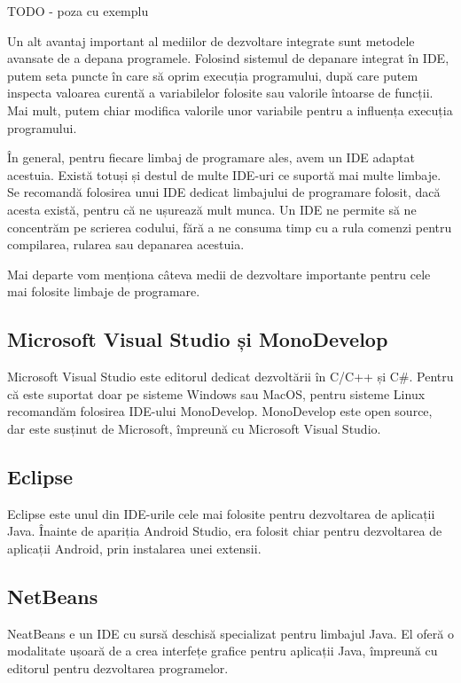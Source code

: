 TODO - poza cu exemplu

Un alt avantaj important al mediilor de dezvoltare integrate sunt metodele
avansate de a depana programele. Folosind sistemul de depanare integrat în IDE,
putem seta puncte în care să oprim execuția programului, după care putem
inspecta valoarea curentă a variabilelor folosite sau valorile întoarse de
funcții. Mai mult, putem chiar modifica valorile unor variabile pentru a
influența execuția programului.

În general, pentru fiecare limbaj de programare ales, avem un IDE adaptat
acestuia. Există totuși și destul de multe IDE-uri ce suportă mai multe limbaje.
Se recomandă folosirea unui IDE dedicat limbajului de programare folosit, dacă
acesta există, pentru că ne ușurează mult munca. Un IDE ne permite să ne
concentrăm pe scrierea codului, fără a ne consuma timp cu a rula comenzi pentru
compilarea, rularea sau depanarea acestuia.

Mai departe vom menționa câteva medii de dezvoltare importante pentru cele mai
folosite limbaje de programare.

\subsection{Microsoft Visual Studio și MonoDevelop}
\label{sec:appdev-ide-vs-mono}

Microsoft Visual Studio este editorul dedicat dezvoltării în C/C++ și C\#.
Pentru că este suportat doar pe sisteme Windows sau MacOS, pentru sisteme Linux
recomandăm folosirea IDE-ului MonoDevelop. MonoDevelop este open source, dar
este susținut de Microsoft, împreună cu Microsoft Visual Studio.

\subsection{Eclipse}
\label{sec:appdev-ide-eclipse}

Eclipse este unul din IDE-urile cele mai folosite pentru dezvoltarea de
aplicații Java. Înainte de apariția Android Studio, era folosit chiar pentru
dezvoltarea de aplicații Android, prin instalarea unei extensii.

\subsection{NetBeans}
\label{sec:appdev-ide-netbeans}

NeatBeans e un IDE cu sursă deschisă specializat pentru limbajul Java. El oferă
o modalitate ușoară de a crea interfețe grafice pentru aplicații Java, împreună
cu editorul pentru dezvoltarea programelor.

